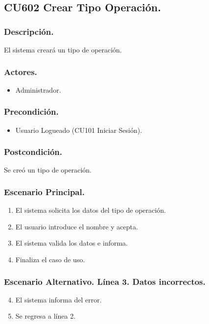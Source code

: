 \subsection{CU602 Crear Tipo Operaci\'{o}n.}
\subsubsection{Descripci\'{o}n.}
El sistema crear\'{a} un tipo de operaci\'{o}n.
\subsubsection{Actores.}
\begin{itemize}
\item Administrador.
\end{itemize}
\subsubsection{Precondici\'{o}n.}
\begin{itemize}
\item Usuario Logueado (CU101 Iniciar Sesi\'{o}n).
\end{itemize}
\subsubsection{Postcondici\'{o}n.}
Se cre\'{o} un tipo de operaci\'{o}n.
\subsubsection{Escenario Principal.}
\begin{enumerate}
\item El sistema solicita los datos del tipo de operaci\'{o}n.
\item El usuario introduce el nombre y acepta.
\item El sistema valida los datos e informa.
\item Finaliza el caso de uso.
\end{enumerate}
\subsubsection{Escenario Alternativo. L\'{i}nea 3. Datos incorrectos.}
\begin{enumerate}
\setcounter{enumi}{3}
\item El sistema informa del error.
\item Se regresa a l\'{i}nea 2.
\end{enumerate}
